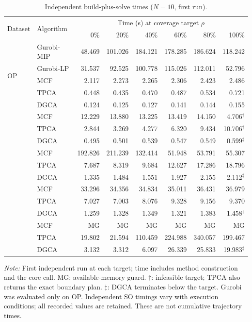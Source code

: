 \begin{table}[t]
\centering
\caption{Independent build-plus-solve times ($N=10$, first run).}
\label{tab:T04_runtime_all_targets_r1}
\small
\setlength{\tabcolsep}{4pt}
\begin{tabular*}{\textwidth}{@{\extracolsep{\fill}}llrrrrrr@{}}
\toprule
\multirow{2}{*}{Dataset} & \multirow{2}{*}{Algorithm} & \multicolumn{6}{c}{Time (s) at coverage target $\rho$} \\
\cmidrule(l){3-8}
 &  & 0\% & 20\% & 40\% & 60\% & 80\% & 100\% \\
\midrule
\multirow{5}{*}{OP} & Gurobi-MIP & 48.469 & 101.026 & 184.121 & 178.285 & 186.624 & 118.242 \\
 & Gurobi-LP & 31.537 & 92.525 & 100.778 & 115.026 & 112.011 & 52.796 \\
 & MCF & 2.117 & 2.273 & 2.265 & 2.306 & 2.423 & 2.486 \\
 & TPCA & 0.448 & 0.435 & 0.470 & 0.487 & 0.534 & 0.721 \\
 & DGCA & 0.124 & 0.125 & 0.127 & 0.141 & 0.144 & 0.155 \\
\addlinespace[4pt]
\multirow{3}{*}{Yelp} & MCF & 12.229 & 13.880 & 13.225 & 13.419 & 14.150 & 4.706$^{\dagger}$ \\
 & TPCA & 2.844 & 3.269 & 4.277 & 6.320 & 9.434 & 10.706$^{\dagger}$ \\
 & DGCA & 0.495 & 0.501 & 0.539 & 0.547 & 0.549 & 0.599$^{\ddagger}$ \\
\addlinespace[4pt]
\multirow{3}{*}{VG} & MCF & 192.826 & 211.239 & 132.414 & 51.948 & 53.791 & 55.307 \\
 & TPCA & 7.687 & 8.319 & 9.684 & 12.627 & 17.286 & 18.796 \\
 & DGCA & 1.335 & 1.484 & 1.551 & 1.927 & 2.155 & 2.112$^{\ddagger}$ \\
\addlinespace[4pt]
\multirow{3}{*}{TG} & MCF & 33.296 & 34.356 & 34.834 & 35.011 & 36.431 & 36.979 \\
 & TPCA & 7.027 & 7.003 & 8.076 & 9.328 & 9.156 & 9.370 \\
 & DGCA & 1.259 & 1.328 & 1.349 & 1.321 & 1.383 & 1.458$^{\ddagger}$ \\
\addlinespace[4pt]
\multirow{3}{*}{SO} & MCF & MG & MG & MG & MG & MG & MG \\
 & TPCA & 19.802 & 21.594 & 110.459 & 224.988 & 340.057 & 199.467 \\
 & DGCA & 3.132 & 3.312 & 6.097 & 26.339 & 25.833 & 19.983$^{\ddagger}$ \\
\bottomrule
\end{tabular*}
\par\smallskip
\begin{minipage}{.98\textwidth}\footnotesize
\textit{Note:} First independent run at each target; time includes method construction and the core call. MG: available-memory guard. $\dagger$: infeasible target; TPCA also returns the exact boundary plan. $\ddagger$: DGCA terminates below the target. Gurobi was evaluated only on OP. Independent SO timings vary with execution conditions; all recorded values are retained. These are not cumulative trajectory times.
\end{minipage}
\end{table}
